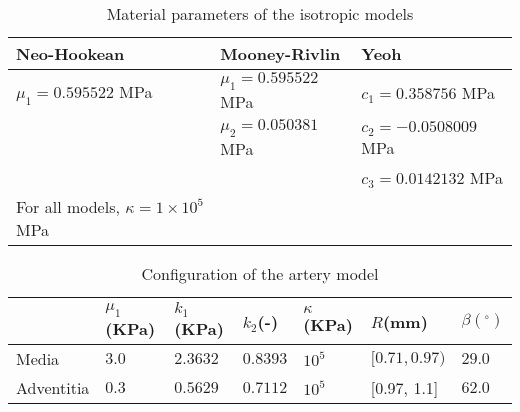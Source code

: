 \begin{table}
\centering
\caption{Material parameters of the isotropic models}
\begin{tabular} { l  l  l }
	\hline
	Neo-Hookean & Mooney-Rivlin & Yeoh \\
	\hline
	$\mu_1 = 0.595522$ MPa & $\mu_1 = 0.595522$ MPa & $c_1 = 0.358756$ MPa \\
	& $\mu_2 = 0.050381$ MPa & $c_2 = - 0.0508009$ MPa \\
	& & $c_3 = 0.0142132$ MPa \\
	\hline
	For all models, $\kappa = 1 \times 10^5 $ MPa \\
	\hline
\end{tabular}
\label{parameters}
\end{table}

\begin{table}
\centering
\caption{Configuration of the artery model}
\label{table:artery}
\begin{tabular}{ l l l l l l l}
\hline
& $\mu_1$(KPa) & $k_1$(KPa) & $k_2$(-) & $\kappa$(KPa) & $R$(mm) & $\beta(^\circ)$ \\
 \hline
 Media &   $3.0$ & $2.3632$ & $0.8393$ & $10^5$ & $[0.71, 0.97)$ & $29.0$\\
 Adventitia & $0.3$ & $0.5629$ & $0.7112$ & $10^5$ & [0.97, 1.1] & $62.0$\\
 \hline
\end{tabular}
\end{table}


